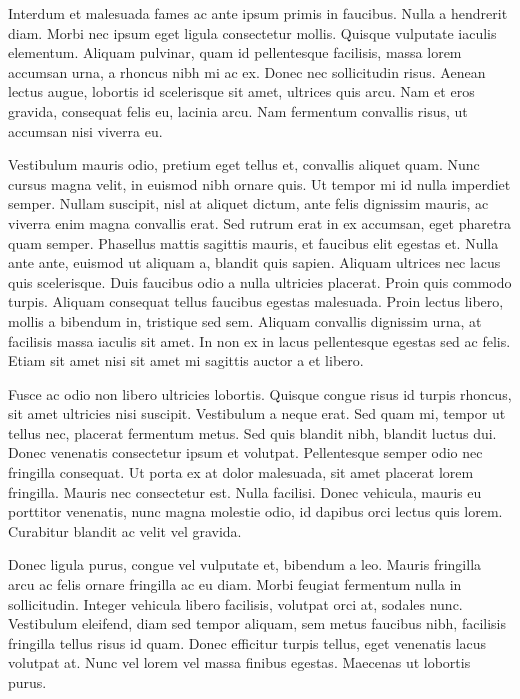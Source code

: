 \documentclass{article}
\begin{document}
Interdum et malesuada fames ac ante ipsum primis in faucibus. Nulla a hendrerit diam. Morbi nec ipsum eget ligula consectetur mollis. Quisque vulputate iaculis elementum. Aliquam pulvinar, quam id pellentesque facilisis, massa lorem accumsan urna, a rhoncus nibh mi ac ex. Donec nec sollicitudin risus. Aenean lectus augue, lobortis id scelerisque sit amet, ultrices quis arcu. Nam et eros gravida, consequat felis eu, lacinia arcu. Nam fermentum convallis risus, ut accumsan nisi viverra eu.


Vestibulum mauris odio, pretium eget tellus et, convallis aliquet quam. Nunc cursus magna velit, in euismod nibh ornare quis. Ut tempor mi id nulla imperdiet semper. Nullam suscipit, nisl at aliquet dictum, ante felis dignissim mauris, ac viverra enim magna convallis erat. Sed rutrum erat in ex accumsan, eget pharetra quam semper. Phasellus mattis sagittis mauris, et faucibus elit egestas et. Nulla ante ante, euismod ut aliquam a, blandit quis sapien. Aliquam ultrices nec lacus quis scelerisque. Duis faucibus odio a nulla ultricies placerat. Proin quis commodo turpis. Aliquam consequat tellus faucibus egestas malesuada. Proin lectus libero, mollis a bibendum in, tristique sed sem. Aliquam convallis dignissim urna, at facilisis massa iaculis sit amet. In non ex in lacus pellentesque egestas sed ac felis. Etiam sit amet nisi sit amet mi sagittis auctor a et libero.


Fusce ac odio non libero ultricies lobortis. Quisque congue risus id turpis rhoncus, sit amet ultricies nisi suscipit. Vestibulum a neque erat. Sed quam mi, tempor ut tellus nec, placerat fermentum metus. Sed quis blandit nibh, blandit luctus dui. Donec venenatis consectetur ipsum et volutpat. Pellentesque semper odio nec fringilla consequat. Ut porta ex at dolor malesuada, sit amet placerat lorem fringilla. Mauris nec consectetur est. Nulla facilisi. Donec vehicula, mauris eu porttitor venenatis, nunc magna molestie odio, id dapibus orci lectus quis lorem. Curabitur blandit ac velit vel gravida.


Donec ligula purus, congue vel vulputate et, bibendum a leo. Mauris fringilla arcu ac felis ornare fringilla ac eu diam. Morbi feugiat fermentum nulla in sollicitudin. Integer vehicula libero facilisis, volutpat orci at, sodales nunc. Vestibulum eleifend, diam sed tempor aliquam, sem metus faucibus nibh, facilisis fringilla tellus risus id quam. Donec efficitur turpis tellus, eget venenatis lacus volutpat at. Nunc vel lorem vel massa finibus egestas. Maecenas ut lobortis purus.
\end{document}
